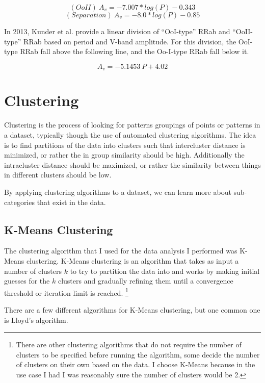 \documentclass[]{article}
\begin{document}
$$
(OoII)~A_{v} = -7.007 * log(P) - 0.343
$$
$$
(Separation)~A_{v} = -8.0 * log(P) - 0.85
$$

In 2013, Kunder et al. provide a linear division of ``OoI-type'' RRab and ``OoII-type'' RRab based on period and V-band amplitude. For this division, the OoI-type RRab fall above the following line, and the Oo-I-type RRab fall below it. \cite{kunder_2013_d}

$$
A_{v} = -5.1453~P + 4.02
$$

\newpage

\section{Clustering}

Clustering is the process of looking for patterns groupings of points or patterns in a dataset, typically though the use of automated clustering algorithms. The idea is to find partitions of the data into clusters such that intercluster distance is minimized, or rather the in group similarity should be high. Additionally the intracluster distance should be maximized, or rather the similarity between things in different clusters should be low. \cite{jain_2010}

By applying clustering algorithms to a dataset, we can learn more about sub-categories that exist in the data. \cite{jain_2010}

\subsection{K-Means Clustering}

The clustering algorithm that I used for the data analysis I performed was K-Means clustering. K-Means clustering is an algorithm that takes as input a number of clusters $k$ to try to partition the data into and works by making initial guesses for the $k$ clusters and gradually refining them until a convergence threshold or iteration limit is reached. \footnote{There are other clustering algorithms that do not require the number of clusters to be specified before running the algorithm, some decide the number of clusters on their own based on the data. I choose K-Means because in the use case I had I was reasonably sure the number of clusters would be 2.} \cite{jain_2010}

There are a few different algorithms for K-Means clustering, but one common one is Lloyd’s algorithm. \cite{arthur_2007}
\end{document}
